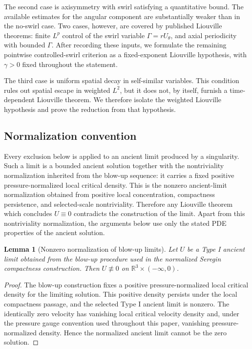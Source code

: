 \documentclass[11pt]{amsart}
\theoremstyle{plain}
\newtheorem{lemma}[theorem]{Lemma}
\theoremstyle{definition}
\theoremstyle{remark}
\numberwithin{equation}{section}
\begin{document}
The second case is axisymmetry with swirl satisfying a quantitative bound.
The available estimates for the angular component are substantially weaker than
in the no-swirl case.  Two cases, however, are covered by published Liouville
theorems: finite \(L^p\) control of the swirl variable
\(\Gamma=rU_\theta\), and axial periodicity with bounded \(\Gamma\).  After
recording these inputs, we formulate the remaining pointwise controlled-swirl
criterion as a fixed-exponent Liouville hypothesis, with \(\gamma>0\) fixed
throughout the statement.

The third case is uniform spatial decay in self-similar variables.  This
condition rules out spatial escape in weighted \(L^2\), but it does not, by
itself, furnish a time-dependent Liouville theorem.  We therefore isolate the
weighted Liouville hypothesis and prove the reduction from that hypothesis.

\subsection{Normalization convention}

Every exclusion below is applied to an ancient limit produced by a singularity.
Such a limit is a bounded ancient solution together with the nontriviality
normalization inherited from the blow-up sequence: it carries a fixed positive
pressure-normalized local critical density.  This is the nonzero ancient-limit
normalization obtained from positive local concentration, compactness
persistence, and selected-scale nontriviality.  Therefore any
Liouville theorem which concludes \(U\equiv0\) contradicts the construction of
the limit.  Apart from this nontriviality normalization, the arguments below
use only the stated PDE properties of the ancient solution.

\begin{lemma}[Nonzero normalization of blow-up limits]
\label{lem:nonzero-normalization}
Let \(U\) be a Type I ancient limit obtained from the blow-up procedure used in
the normalized Seregin compactness construction.  Then \(U\not\equiv0\) on
\(\mathbb R^3\times(-\infty,0)\).
\end{lemma}

\begin{proof}
The blow-up construction fixes a positive pressure-normalized local critical
density for the limiting solution.  This positive density persists under the
local compactness passage, and the selected Type I ancient limit is nonzero.  The
identically zero velocity has vanishing local critical velocity density and,
under the pressure gauge convention used throughout this paper, vanishing
pressure-normalized density.  Hence the normalized ancient limit cannot be the
zero solution.
\end{proof}
\end{document}
